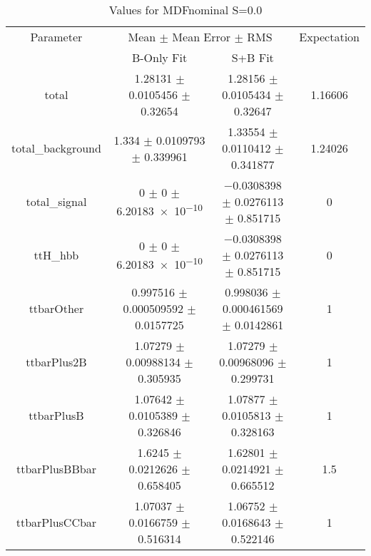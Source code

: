 \begin{table}
\centering
\caption{Values for MDFnominal S=0.0}
\begin{tabular}{cccc}
\toprule
Parameter & \multicolumn{2}{c}{Mean $\pm$ Mean Error $\pm$ RMS} & Expectation\\
 & B-Only Fit & S+B Fit & \\
\midrule
total & \num{1.28131} $\pm$ \num{0.0105456} $\pm$ \num{0.32654} & \num{1.28156} $\pm$ \num{0.0105434} $\pm$ \num{0.32647} & \num{1.16606}\\
total\_background & \num{1.334} $\pm$ \num{0.0109793} $\pm$ \num{0.339961} & \num{1.33554} $\pm$ \num{0.0110412} $\pm$ \num{0.341877} & \num{1.24026}\\
total\_signal & \num{0} $\pm$ \num{0} $\pm$ \num{6.20183e-10} & \num{-0.0308398} $\pm$ \num{0.0276113} $\pm$ \num{0.851715} & \num{0}\\
ttH\_hbb & \num{0} $\pm$ \num{0} $\pm$ \num{6.20183e-10} & \num{-0.0308398} $\pm$ \num{0.0276113} $\pm$ \num{0.851715} & \num{0}\\
ttbarOther & \num{0.997516} $\pm$ \num{0.000509592} $\pm$ \num{0.0157725} & \num{0.998036} $\pm$ \num{0.000461569} $\pm$ \num{0.0142861} & \num{1}\\
ttbarPlus2B & \num{1.07279} $\pm$ \num{0.00988134} $\pm$ \num{0.305935} & \num{1.07279} $\pm$ \num{0.00968096} $\pm$ \num{0.299731} & \num{1}\\
ttbarPlusB & \num{1.07642} $\pm$ \num{0.0105389} $\pm$ \num{0.326846} & \num{1.07877} $\pm$ \num{0.0105813} $\pm$ \num{0.328163} & \num{1}\\
ttbarPlusBBbar & \num{1.6245} $\pm$ \num{0.0212626} $\pm$ \num{0.658405} & \num{1.62801} $\pm$ \num{0.0214921} $\pm$ \num{0.665512} & \num{1.5}\\
ttbarPlusCCbar & \num{1.07037} $\pm$ \num{0.0166759} $\pm$ \num{0.516314} & \num{1.06752} $\pm$ \num{0.0168643} $\pm$ \num{0.522146} & \num{1}\\
\bottomrule
\end{tabular}
\end{table}